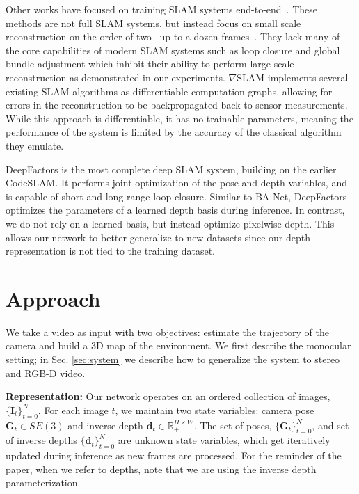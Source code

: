 \documentclass{article}
\begin{document}
Other works have focused on training SLAM systems end-to-end~\cite{deeptam,banet,lsnet,demon,neuralrgbd,deepv2d,tartanvo}. These methods are not full SLAM systems, but instead focus on small scale reconstruction on the order of two~\cite{lsnet,demon,tartanvo} up to a dozen frames~\cite{deeptam,banet,deepv2d}. They lack many of the core capabilities of modern SLAM systems such as loop closure and global bundle adjustment which inhibit their ability to perform large scale reconstruction as demonstrated in our experiments. $\nabla$SLAM\cite{gradslam} implements several existing SLAM algorithms as differentiable computation graphs, allowing for errors in the reconstruction to be backpropagated back to sensor measurements. While this approach is differentiable, it has no trainable parameters, meaning the performance of the system is limited by the accuracy of the classical algorithm they emulate.

DeepFactors\cite{deepfactors} is the most complete deep SLAM system, building on the earlier CodeSLAM\cite{codeslam}. It performs joint optimization of the pose and depth variables, and is capable of short and long-range loop closure. Similar to BA-Net\cite{banet}, DeepFactors optimizes the parameters of a learned depth basis during inference. In contrast, we do not rely on a learned basis, but instead optimize pixelwise depth. This allows our network to better generalize to new datasets since our depth representation is not tied to the training dataset.


\vspace{-2mm}
\section{Approach}
\vspace{-1mm}


We take a video as input with two objectives: estimate the trajectory of the camera and build a 3D map of the environment. We first describe the monocular setting; in Sec. \ref{sec:system} we describe how to generalize the system to stereo and RGB-D video.

\textbf{Representation:} Our network operates on an ordered collection of images, $\{\mathbf{I}_t\}_{t=0}^N$. For each image $t$, we maintain two state variables: camera pose $\mathbf{G}_t \in SE(3)$ and inverse depth $\mathbf{d}_t \in \mathbb{R}_{+}^{H\times W}$. The set of poses, $\{\mathbf{G}_t\}_{t=0}^N$, and set of inverse depths $\{\mathbf{d}_t\}_{t=0}^N$ are unknown state variables, which get iteratively updated during inference as new frames are processed. For the reminder of the paper, when we refer to depths, note that we are using the inverse depth parameterization.
\end{document}
